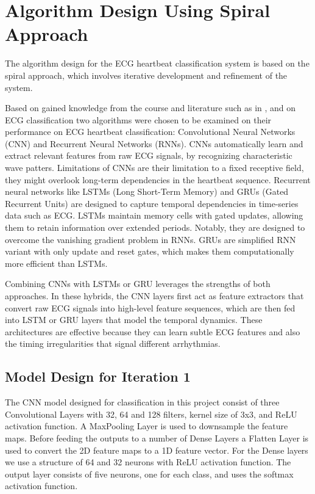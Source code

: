 \section{Algorithm Design Using Spiral Approach}
The algorithm design for the ECG heartbeat classification system is based on the spiral approach, which involves iterative development and refinement of the system. 

Based on gained knowledge from the course and literature such as in \cite{b3}, \cite{b4} and \cite{b5} on ECG classification two algorithms were chosen to be examined on their performance on ECG heartbeat classification: Convolutional Neural Networks (CNN) and Recurrent Neural Networks (RNNs). CNNs automatically learn and extract relevant features from raw ECG signals, by recognizing characteristic wave patters. Limitations of CNNs are their limitation to a fixed receptive field, they might overlook long-term dependencies in the heartbeat sequence. 
Recurrent neural networks like LSTMs (Long Short-Term Memory) and GRUs (Gated Recurrent Units) are designed to capture temporal dependencies in time-series data such as ECG. LSTMs maintain memory cells with gated updates, allowing them to retain information over extended periods. Notably, they are designed to overcome the vanishing gradient problem in RNNs. GRUs are simplified RNN variant with only update and reset gates, which makes them computationally more efficient than LSTMs.

Combining CNNs with LSTMs or GRU leverages the strengths of both approaches. In these hybrids, the CNN layers first act as feature extractors that convert raw ECG signals into high-level feature sequences, which are then fed into LSTM or GRU layers that model the temporal dynamics. These architectures are effective because they can learn subtle ECG features and also the timing irregularities that signal different arrhythmias. 

\subsection{Model Design for Iteration 1}
The CNN model designed for classification in this project consist of three Convolutional Layers with 32, 64 and 128 filters, kernel size of 3x3, and ReLU activation function. A MaxPooling Layer is used to downsample the feature maps. Before feeding the outputs to a number of Dense Layers a Flatten Layer is used to convert the 2D feature maps to a 1D feature vector. For the Dense layers we use a structure of 64 and 32 neurons with ReLU activation function. The output layer consists of five neurons, one for each class, and uses the softmax activation function.

